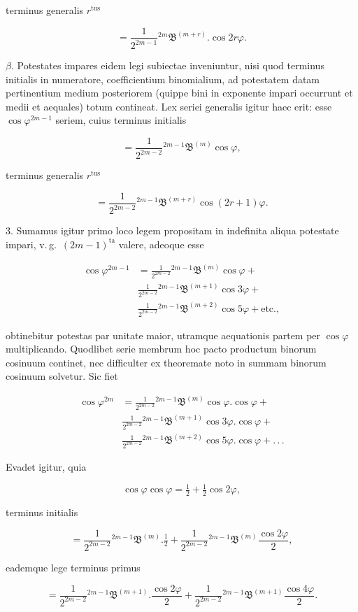\par\noindent{}%
terminus generalis $r^{\text{tus}}$

\[ = \frac{1}{2^{2m-1}}{}^{2m}\!\mathfrak{B}^{(m+r)}\! . \cos 2r\varphi. \]

$\beta$. Potestates impares eidem legi subiectae inveniuntur, nisi quod
\noindent terminus initialis in numeratore, coefficientium binomialium, ad
potestatem datam pertinentium medium posteriorem (quippe bini in exponente
impari occurrunt et medii et aequales) totum contineat. Lex seriei
generalis igitur haec erit: esse $\cos\varphi^{2m-1}$ seriem, cuius
\noindent terminus initialis

\[ = \frac{1}{2^{2m-2}}{}^{2m-1}\!\mathfrak{B}^{(m)}\cos\varphi, \]

\noindent terminus generalis $r^{\text{tus}}$

\[ = \frac{1}{2^{2m-2}}{}^{2m-1}\!\mathfrak{B}^{(m+r)}\cos(2r+1)\varphi. \]

3. Sumamus igitur primo loco legem propositam in indefinita aliqua
potestate impari, v.\,g.\ $(2m-1)^{\text{ta}}$ valere, adeoque esse

\[
\begin{aligned}
\cos\varphi^{2m-1} & = \frac{1}{2^{2m-2}}{}^{2m-1}\!\mathfrak{B}^{(m)}\cos\varphi +\\
&{} \frac{1}{2^{2m-2}}{}^{2m-1}\!\mathfrak{B}^{(m+1)}\cos 3\varphi +\\
&{} \frac{1}{2^{2m-2}}{}^{2m-1}\!\mathfrak{B}^{(m+2)}\cos 5\varphi + \text{etc.},
\end{aligned}
\]

\noindent obtinebitur potestas par unitate maior, utramque aequationis partem per
$\cos\varphi$ multiplicando. Quodlibet serie membrum hoc pacto productum
binorum cosinuum continet, nec difficulter ex theoremate noto in summam
binorum cosinuum solvetur. Sic fiet

\[
\begin{aligned}
\cos\varphi^{2m} & = \frac{1}{2^{2m-2}}{}^{2m-1}\!\mathfrak{B}^{(m)}\cos\varphi . \cos\varphi +\\
&{} \frac{1}{2^{2m-2}}{}^{2m-1}\!\mathfrak{B}^{(m+1)}\cos 3\varphi . \cos\varphi +\\
&{} \frac{1}{2^{2m-2}}{}^{2m-1}\!\mathfrak{B}^{(m+2)}\cos 5\varphi . \cos\varphi + .\,.\,.
\end{aligned}
\]

\noindent Evadet igitur, quia

\[ \cos\varphi\cos\varphi = \tfrac12+\tfrac12\cos 2\varphi, \]

\noindent terminus initialis

\[ = \frac{1}{2^{2m-2}}{}^{2m-1}\!\mathfrak{B}^{(m)} . \tfrac12 +
\frac{1}{2^{2m-2}}{}^{2m-1}\!\mathfrak{B}^{(m)}\frac{\cos 2\varphi}{2}, \]

\noindent eademque lege terminus primus

\[ = \frac{1}{2^{2m-2}}{}^{2m-1}\!\mathfrak{B}^{(m+1)} . \frac{\cos 2\varphi}{2} +
\frac{1}{2^{2m-2}}{}^{2m-1}\!\mathfrak{B}^{(m+1)}\frac{\cos 4\varphi}{2}. \]
